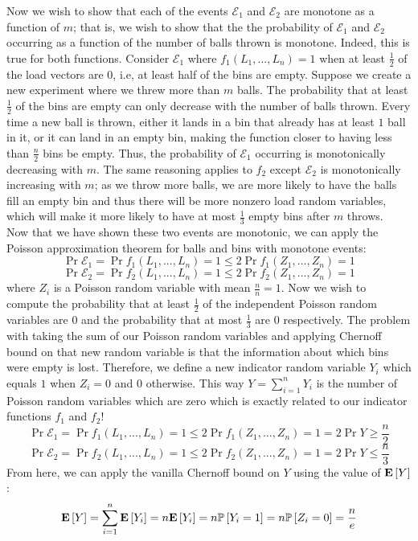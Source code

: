 \documentclass[12pt]{article}
\begin{document}
\begin{solution}
\begin{enumerate}[label=(\alph*)]
\[\]
Now we wish to show that each of the events $\mathcal{E}_1$ and $\mathcal{E}_2$ are monotone as a function of $m$; that is, we wish to show that the the probability of $\mathcal{E}_1$ and $\mathcal{E}_2$ occurring as a function of the number of balls thrown is monotone. Indeed, this is true for both functions. Consider $\mathcal{E}_1$ where $f_{1}(L_1, ..., L_n)=1$ when at least $\frac{1}{2}$ of the load vectors are $0$, i.e, at least half of the bins are empty. Suppose we create a new experiment where we threw more than $m$ balls. The probability that at least $\frac{1}{2}$ of the bins are empty can only decrease with the number of balls thrown. Every time a new ball is thrown, either it lands in a bin that already has at least $1$ ball in it, or it can land in an empty bin, making the function closer to having less than $\frac{n}{2}$ bins be empty. Thus, the probability of $\mathcal{E}_1$ occurring is monotonically decreasing with $m$. The same reasoning applies to $f_2$ except $\mathcal{E}_2$ is monotonically increasing with $m$; as we throw more balls, we are more likely to have the balls fill an empty bin and thus there will be more nonzero load random variables, which will make it more likely to have at most $\frac{1}{3}$ empty bins after $m$ throws. \\
Now that we have shown these two events are monotonic, we can apply the Poisson approximation theorem for balls and bins with monotone events:
\[
\Pr{\mathcal{E}_1} = \Pr{f_{1}(L_1, ..., L_n)=1} \leq 2\Pr{f_{1}(Z_1, ..., Z_n)=1}
\]
\[
\Pr{\mathcal{E}_2} = \Pr{f_{2}(L_1, ..., L_n)=1} \leq 2\Pr{f_{2}(Z_1, ..., Z_n)=1}
\]
where $Z_i$ is a Poisson random variable with mean $\frac{n}{n} = 1$. Now we wish to compute the probability that at least $\frac{1}{2}$ of the independent Poisson random variables are $0$ and the probability that at most $\frac{1}{3}$ are $0$ respectively. The problem with taking the sum of our Poisson random variables and applying Chernoff bound on that new random variable is that the information about which bins were empty is lost. Therefore, we define a new indicator random variable $Y_i$ which equals $1$ when $Z_i =0$ and $0$ otherwise. This way $Y = \sum_{i=1}^{n}{Y_i}$ is the number of Poisson random variables which are zero which is exactly related to our indicator functions $f_1$ and $f_2$! 
\[
\Pr{\mathcal{E}_1} = \Pr{f_{1}(L_1, ..., L_n)=1} \leq 2\Pr{f_{1}(Z_1, ..., Z_n)=1} = 2\Pr{Y \geq \frac{n}{2}}
\]
\[
\Pr{\mathcal{E}_2} = \Pr{f_{2}(L_1, ..., L_n)=1} \leq 2\Pr{f_{2}(Z_1, ..., Z_n)=1} = 2\Pr{Y \leq \frac{n}{3}}
\]
From here, we can apply the vanilla Chernoff bound on $Y$ using the value of $\mathbf{E}\left[Y\right]$:
\[
\mathbf{E}\left[Y\right] = \sum_{i=1}^{n}{\mathbf{E}\left[Y_i\right]} = n\mathbf{E}\left[Y_i\right] = n\mathbb{P}\left[Y_i=1\right] = n\mathbb{P}\left[Z_i=0\right] = \frac{n}{e}
\]


\end{enumerate}
\end{solution}
\end{document}
